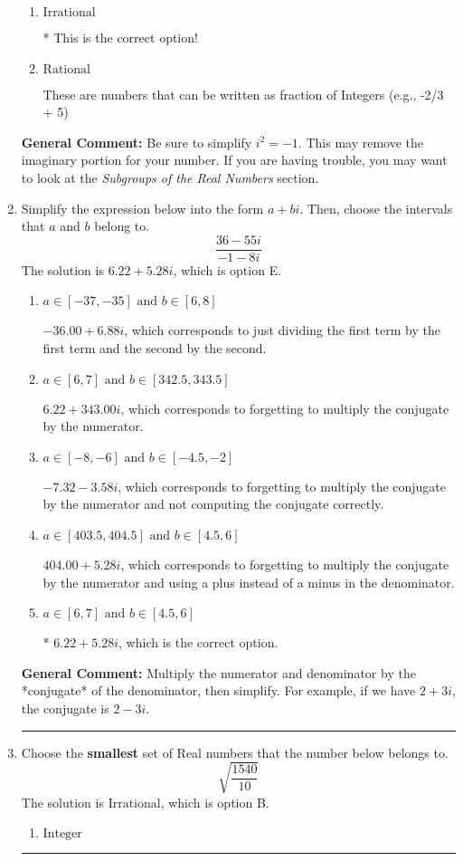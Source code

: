 \documentclass{extbook}[14pt]
\newcommand{\litem}[1]{\item #1

\rule{\textwidth}{0.4pt}}
\begin{document}
\begin{enumerate}
{\begin{enumerate}[label=\Alph*.]
This is a Complex number $(a+bi)$ that is not Real (has $i$ as part of the number).
\item \( \text{Irrational} \)

* This is the correct option!
\item \( \text{Rational} \)

These are numbers that can be written as fraction of Integers (e.g., -2/3 + 5)
\end{enumerate}

\textbf{General Comment:} Be sure to simplify $i^2 = -1$. This may remove the imaginary portion for your number. If you are having trouble, you may want to look at the \textit{Subgroups of the Real Numbers} section.
}
\litem{
Simplify the expression below into the form $a+bi$. Then, choose the intervals that $a$ and $b$ belong to.
\[ \frac{36 - 55 i}{-1 - 8 i} \]The solution is \( 6.22  + 5.28 i \), which is option E.\begin{enumerate}[label=\Alph*.]
\item \( a \in [-37, -35] \text{ and } b \in [6, 8] \)

 $-36.00  + 6.88 i$, which corresponds to just dividing the first term by the first term and the second by the second.
\item \( a \in [6, 7] \text{ and } b \in [342.5, 343.5] \)

 $6.22  + 343.00 i$, which corresponds to forgetting to multiply the conjugate by the numerator.
\item \( a \in [-8, -6] \text{ and } b \in [-4.5, -2] \)

 $-7.32  - 3.58 i$, which corresponds to forgetting to multiply the conjugate by the numerator and not computing the conjugate correctly.
\item \( a \in [403.5, 404.5] \text{ and } b \in [4.5, 6] \)

 $404.00  + 5.28 i$, which corresponds to forgetting to multiply the conjugate by the numerator and using a plus instead of a minus in the denominator.
\item \( a \in [6, 7] \text{ and } b \in [4.5, 6] \)

* $6.22  + 5.28 i$, which is the correct option.
\end{enumerate}

\textbf{General Comment:} Multiply the numerator and denominator by the *conjugate* of the denominator, then simplify. For example, if we have $2+3i$, the conjugate is $2-3i$.
}
\litem{
Choose the \textbf{smallest} set of Real numbers that the number below belongs to.
\[ \sqrt{\frac{1540}{10}} \]The solution is \( \text{Irrational} \), which is option B.\begin{enumerate}[label=\Alph*.]
\item \( \text{Integer} \)


\end{enumerate}}
\end{enumerate}
\end{document}
